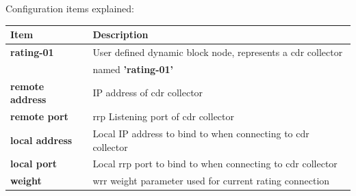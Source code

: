 \documentclass[a4paper,latin]{paper}
\begin{document}
\noindent{}Configuration items explained:\\
\begin{tabularx}{\textwidth}{ | l | X | }
	\hline
	Item	 		& Description \\
	\hline
	\textbf{rating-01}	& User defined dynamic block node, represents a \acrfull{cdr} collector \\
				& named \textbf{'rating-01'} \\
	\textbf{remote address}	& IP address of \acrfull{cdr} collector \\
	\textbf{remote port}	& \acrshort{rrp} Listening port of \acrfull{cdr} collector \\
	\textbf{local address}	& Local IP address to bind to when connecting to \acrfull{cdr} collector \\
	\textbf{local port}	& Local \acrshort{rrp} port to bind to when connecting to \acrfull{cdr} collector \\
	\textbf{weight}		& \acrfull{wrr} weight parameter used for current rating connection \\
	\hline
\end{tabularx}\\\\
\end{document}
